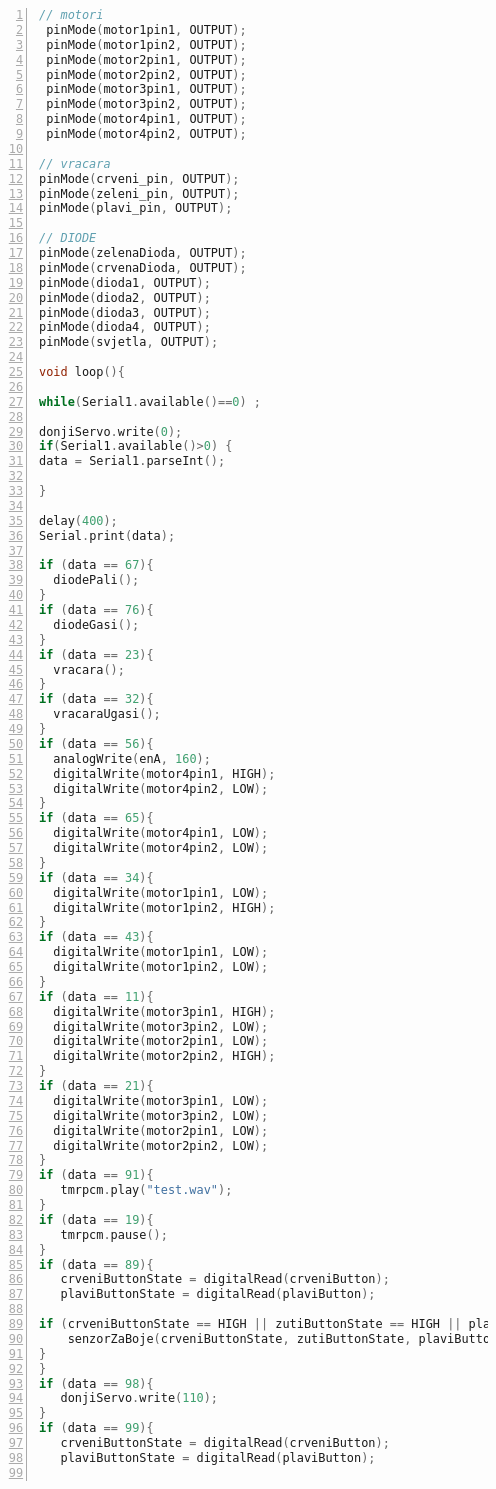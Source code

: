 \begin{lstlisting}[frame=single,language=C++,numbers=left, numberstyle=\tiny, xleftmargin=0.05\textwidth, xrightmargin=0.05\textwidth, basicstyle=\ttfamily\footnotesize]
// motori
 pinMode(motor1pin1, OUTPUT);
 pinMode(motor1pin2, OUTPUT);
 pinMode(motor2pin1, OUTPUT);
 pinMode(motor2pin2, OUTPUT);
 pinMode(motor3pin1, OUTPUT);
 pinMode(motor3pin2, OUTPUT);
 pinMode(motor4pin1, OUTPUT);
 pinMode(motor4pin2, OUTPUT);

// vracara
pinMode(crveni_pin, OUTPUT);
pinMode(zeleni_pin, OUTPUT);
pinMode(plavi_pin, OUTPUT);
 
// DIODE
pinMode(zelenaDioda, OUTPUT);
pinMode(crvenaDioda, OUTPUT);
pinMode(dioda1, OUTPUT);
pinMode(dioda2, OUTPUT);
pinMode(dioda3, OUTPUT);
pinMode(dioda4, OUTPUT);
pinMode(svjetla, OUTPUT);
    
void loop(){
 
while(Serial1.available()==0) ;

donjiServo.write(0);
if(Serial1.available()>0) {
data = Serial1.parseInt();
 
} 

delay(400);
Serial.print(data);
 
if (data == 67){
  diodePali();
}
if (data == 76){
  diodeGasi();
}
if (data == 23){
  vracara();
}
if (data == 32){
  vracaraUgasi();
}
if (data == 56){
  analogWrite(enA, 160); 
  digitalWrite(motor4pin1, HIGH);
  digitalWrite(motor4pin2, LOW);
}
if (data == 65){
  digitalWrite(motor4pin1, LOW);
  digitalWrite(motor4pin2, LOW);
}
if (data == 34){
  digitalWrite(motor1pin1, LOW);
  digitalWrite(motor1pin2, HIGH);
}
if (data == 43){
  digitalWrite(motor1pin1, LOW);
  digitalWrite(motor1pin2, LOW);
}
if (data == 11){ 
  digitalWrite(motor3pin1, HIGH);
  digitalWrite(motor3pin2, LOW);
  digitalWrite(motor2pin1, LOW);
  digitalWrite(motor2pin2, HIGH);
}
if (data == 21){
  digitalWrite(motor3pin1, LOW);
  digitalWrite(motor3pin2, LOW);
  digitalWrite(motor2pin1, LOW);
  digitalWrite(motor2pin2, LOW);
}
if (data == 91){ 
   tmrpcm.play("test.wav");
}
if (data == 19){
   tmrpcm.pause();
}
if (data == 89){ 
   crveniButtonState = digitalRead(crveniButton);
   plaviButtonState = digitalRead(plaviButton);

if (crveniButtonState == HIGH || zutiButtonState == HIGH || plaviButtonState == HIGH) {
    senzorZaBoje(crveniButtonState, zutiButtonState, plaviButtonState);
}
}
if (data == 98){
   donjiServo.write(110);
}
if (data == 99){ 
   crveniButtonState = digitalRead(crveniButton);
   plaviButtonState = digitalRead(plaviButton);


\end{lstlisting}
